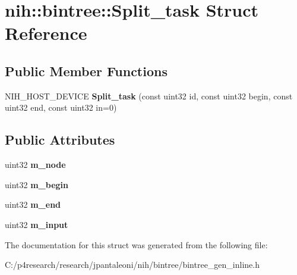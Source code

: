 \hypertarget{structnih_1_1bintree_1_1_split__task}{
\section{nih\-:\-:bintree\-:\-:\-Split\-\_\-task \-Struct \-Reference}
\label{structnih_1_1bintree_1_1_split__task}
}
\subsection*{\-Public \-Member \-Functions}
\begin{DoxyCompactItemize}
\item 
\hypertarget{structnih_1_1bintree_1_1_split__task_a6b8703608b459fcbc0af077901c25b6a}{
\-N\-I\-H\-\_\-\-H\-O\-S\-T\-\_\-\-D\-E\-V\-I\-C\-E {\bfseries \-Split\-\_\-task} (const uint32 id, const uint32 begin, const uint32 end, const uint32 in=0)}
\label{structnih_1_1bintree_1_1_split__task_a6b8703608b459fcbc0af077901c25b6a}

\end{DoxyCompactItemize}
\subsection*{\-Public \-Attributes}
\begin{DoxyCompactItemize}
\item 
\hypertarget{structnih_1_1bintree_1_1_split__task_aee4a7c2251650f82d4c9492012c41477}{
uint32 {\bfseries m\-\_\-node}}
\label{structnih_1_1bintree_1_1_split__task_aee4a7c2251650f82d4c9492012c41477}

\item 
\hypertarget{structnih_1_1bintree_1_1_split__task_afa16e63fc29dabf61b3cb6e53fa4a000}{
uint32 {\bfseries m\-\_\-begin}}
\label{structnih_1_1bintree_1_1_split__task_afa16e63fc29dabf61b3cb6e53fa4a000}

\item 
\hypertarget{structnih_1_1bintree_1_1_split__task_aa8a14d7476151677f01ec3703d1862bc}{
uint32 {\bfseries m\-\_\-end}}
\label{structnih_1_1bintree_1_1_split__task_aa8a14d7476151677f01ec3703d1862bc}

\item 
\hypertarget{structnih_1_1bintree_1_1_split__task_a5889b6f707b78ff9b306738352078251}{
uint32 {\bfseries m\-\_\-input}}
\label{structnih_1_1bintree_1_1_split__task_a5889b6f707b78ff9b306738352078251}

\end{DoxyCompactItemize}


\-The documentation for this struct was generated from the following file\-:\begin{DoxyCompactItemize}
\item 
\-C\-:/p4research/research/jpantaleoni/nih/bintree/bintree\-\_\-gen\-\_\-inline.\-h\end{DoxyCompactItemize}
